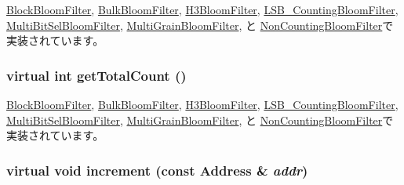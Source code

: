 \hyperlink{classBlockBloomFilter_a19f42f6f2fc3501021b768f0df8108b2}{BlockBloomFilter}, \hyperlink{classBulkBloomFilter_a19f42f6f2fc3501021b768f0df8108b2}{BulkBloomFilter}, \hyperlink{classH3BloomFilter_a19f42f6f2fc3501021b768f0df8108b2}{H3BloomFilter}, \hyperlink{classLSB__CountingBloomFilter_a19f42f6f2fc3501021b768f0df8108b2}{LSB\_\-CountingBloomFilter}, \hyperlink{classMultiBitSelBloomFilter_a19f42f6f2fc3501021b768f0df8108b2}{MultiBitSelBloomFilter}, \hyperlink{classMultiGrainBloomFilter_a19f42f6f2fc3501021b768f0df8108b2}{MultiGrainBloomFilter}, と \hyperlink{classNonCountingBloomFilter_a19f42f6f2fc3501021b768f0df8108b2}{NonCountingBloomFilter}で実装されています。\hypertarget{classAbstractBloomFilter_a25ea5e1ef3d4911226f37649b6efed22}{
\subsubsection[{getTotalCount}]{\setlength{\rightskip}{0pt plus 5cm}virtual int getTotalCount ()}}
\label{classAbstractBloomFilter_a25ea5e1ef3d4911226f37649b6efed22}


\hyperlink{classBlockBloomFilter_a97f66183ea41a7c123bab9dd5313a74a}{BlockBloomFilter}, \hyperlink{classBulkBloomFilter_a97f66183ea41a7c123bab9dd5313a74a}{BulkBloomFilter}, \hyperlink{classH3BloomFilter_a97f66183ea41a7c123bab9dd5313a74a}{H3BloomFilter}, \hyperlink{classLSB__CountingBloomFilter_a97f66183ea41a7c123bab9dd5313a74a}{LSB\_\-CountingBloomFilter}, \hyperlink{classMultiBitSelBloomFilter_a97f66183ea41a7c123bab9dd5313a74a}{MultiBitSelBloomFilter}, \hyperlink{classMultiGrainBloomFilter_a97f66183ea41a7c123bab9dd5313a74a}{MultiGrainBloomFilter}, と \hyperlink{classNonCountingBloomFilter_a97f66183ea41a7c123bab9dd5313a74a}{NonCountingBloomFilter}で実装されています。\hypertarget{classAbstractBloomFilter_af795f7fdeff0174e914ed1d792ffe4ff}{
\subsubsection[{increment}]{\setlength{\rightskip}{0pt plus 5cm}virtual void increment (const {\bf Address} \& {\em addr})}}
\label{classAbstractBloomFilter_af795f7fdeff0174e914ed1d792ffe4ff}


